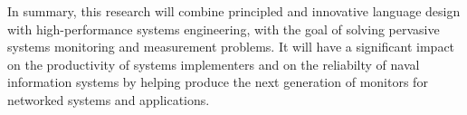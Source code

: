 
In summary, this research will combine principled and innovative
language design with high-performance systems engineering, with the
goal of solving pervasive systems monitoring and measurement problems.
It will have a significant impact on the
productivity of systems implementers and on the reliabilty of
naval information systems by helping produce the next
generation of monitors for networked systems and applications.


